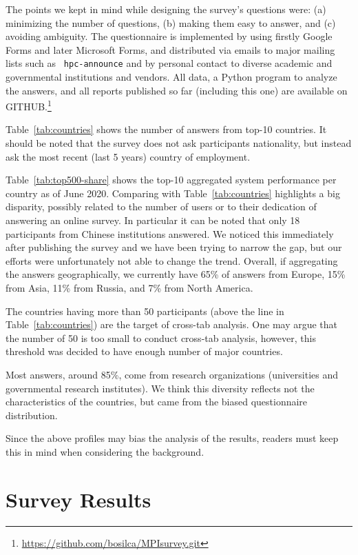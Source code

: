 \documentclass[sigconf,nonacm]{acmart}
\begin{document}
The points we kept in mind while designing the survey's questions
were: (a) minimizing the number of questions, (b) making them easy to
answer, and (c) avoiding ambiguity. The questionnaire is implemented
by using firstly Google Forms and later Microsoft Forms, and
distributed via emails to major mailing lists such as {\tt
  hpc-announce} and by personal contact to diverse academic and
governmental institutions and vendors. All data, a Python program to
analyze the answers, and all reports published so far (including this
one) are available on
GITHUB.\footnote{\url{https://github.com/bosilca/MPIsurvey.git}}

Table~\ref{tab:countries} shows the number of answers from top-10 countries. It
should be noted that the survey does not ask participants nationality, but
instead ask the most recent (last 5 years) country of employment.

Table~\ref{tab:top500-share} shows the top-10 aggregated system
performance per country as of June 2020. Comparing with
Table~\ref{tab:countries} highlights a big disparity, possibly related
to the number of users or to their dedication of answering an online
survey. In particular it can be noted that only 18 participants from
Chinese institutions answered. We noticed this immediately after
publishing the survey and we have been trying to narrow the gap, but
our efforts were unfortunately not able to change the trend. Overall,
if aggregating the answers geographically, we currently have 65\% of
answers from Europe, 15\% from Asia, 11\% from Russia, and 7\% from
North America.

The countries having more than 50 participants (above the line in
Table~\ref{tab:countries}) are the target of cross-tab analysis. One
may argue that the number of 50 is too small to conduct cross-tab
analysis, however, this threshold was decided to have enough number of 
major countries.

Most answers, around 85\%, come from research organizations
(universities and governmental research institutes).  We think this
diversity reflects not the characteristics of the countries, but
came from the biased questionnaire distribution.

Since the above profiles may bias the analysis of the results,
readers must keep this in mind when considering the background. 

\section{Survey Results}
\end{document}
